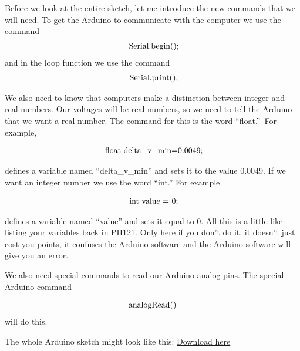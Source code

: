 Before we look at the entire sketch, let me introduce the new commands that
we will need. To get the Arduino to communicate with the computer we use the
command 
\begin{equation*}
	\begin{tabular}{l}
		\ Serial.begin();
	\end{tabular}%
\end{equation*}
and in the loop function we use the command\ 
\begin{equation*}
	\begin{tabular}{l}
		\ Serial.print();
	\end{tabular}%
\end{equation*}

We also need to know that computers make a distinction between integer and
real numbers. Our voltages will be real numbers, so we need to tell the
Arduino that we want a real number. The command for this is the word
\textquotedblleft float.\textquotedblright\ For example,

\begin{equation*}
	\begin{tabular}{l}
		\ float\ delta\_v\_min=0.0049;
	\end{tabular}
\end{equation*}

defines a variable named ``delta\_v\_min'' and sets it to the value $0.0049.$ If we want an integer number we use the word ``int.'' For example

\begin{equation*}
	\begin{tabular}{l}
		\ int\ value\ =\ 0;
	\end{tabular}
\end{equation*}

defines a variable named ``value'' and sets it equal to $0.$ All this is a little like listing your variables back in PH121. Only here if you don't do it, it doesn't just cost you points, it confuses the Arduino software and the Arduino software will give you an error.

We also need special commands to read our Arduino analog pins. The special Arduino command 

\begin{equation*}
	\begin{tabular}{l}
		analogRead()
	\end{tabular}
\end{equation*}
will do this.

The whole Arduino sketch might look like this:
\href{https://dtoliphant.github.io/PH250Manual/Code/DAQ_voltmeter.ino}{Download here}



